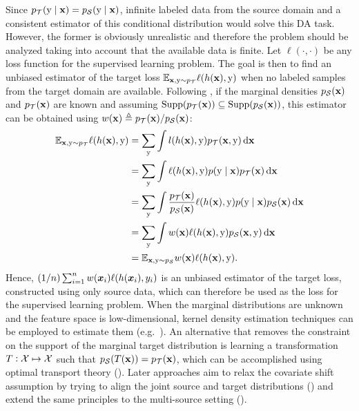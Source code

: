 Since $p_{\mathcal{T}}({\textnormal{y}} \mid {\mathbf{x}}) = p_{\mathcal{S}}({\textnormal{y}} \mid {\mathbf{x}})$, infinite labeled data from the source domain and a consistent estimator of this conditional distribution would solve this DA task. However, the former is obviously unrealistic and therefore the problem should be analyzed taking into account that the available data is finite. Let $\ell(\cdot, \cdot)$ be any loss function for the supervised learning problem. The goal is then to find an unbiased estimator of the target loss $\mathbb{E}_{{\mathbf{x}}, {\textnormal{y}} \sim p_{\mathcal{T}}} \ell(h({\mathbf{x}}),{\textnormal{y}})$ when no labeled samples from the target domain are available. Following \citet{Sugiyama2007}, if the marginal densities $p_{\mathcal{S}}({\mathbf{x}})$ and $p_{\mathcal{T}}({\mathbf{x}})$ are known and assuming $\mathrm{Supp}(p_{\mathcal{T}}({\mathbf{x}})) \subseteq \mathrm{Supp}(p_{\mathcal{S}}({\mathbf{x}}))$, this estimator can be obtained using  $w({\mathbf{x}}) \triangleq p_{\mathcal{T}}({\mathbf{x}})/p_{\mathcal{S}}({\mathbf{x}})$:
\begin{align}
	\mathbb{E}_{{\mathbf{x}}, {\textnormal{y}} \sim p_{\mathcal{T}}} \ell(h({\mathbf{x}}),{\textnormal{y}}) &= \sum_{{\textnormal{y}}} \int l(h({\mathbf{x}}),{\textnormal{y}}) p_{\mathcal{T}}({\mathbf{x}}, {\textnormal{y}}) {\,\text{d}}{\mathbf{x}} \nonumber\\
	&= \sum_{{\textnormal{y}}} \int \ell(h({\mathbf{x}}),{\textnormal{y}}) p({\textnormal{y}} \mid {\mathbf{x}}) p_{\mathcal{T}}({\mathbf{x}}) {\,\text{d}}{\mathbf{x}} \nonumber\\
	&= \sum_{{\textnormal{y}}} \int \frac{p_{\mathcal{T}}({\mathbf{x}})}{p_{\mathcal{S}}({\mathbf{x}})} \ell(h({\mathbf{x}}),{\textnormal{y}})  p({\textnormal{y}} \mid {\mathbf{x}}) p_{\mathcal{S}}({\mathbf{x}}) {\,\text{d}}{\mathbf{x}} \nonumber\\
	&= \sum_{{\textnormal{y}}} \int w({\mathbf{x}}) \ell(h({\mathbf{x}}),{\textnormal{y}})  p_{\mathcal{S}}({\mathbf{x}}, {\textnormal{y}}) {\,\text{d}}{\mathbf{x}} \nonumber\\
	&= \mathbb{E}_{{\mathbf{x}}, {\textnormal{y}} \sim p_{\mathcal{S}}} w({\mathbf{x}}) \ell(h({\mathbf{x}}),{\textnormal{y}}).
\end{align}
Hence, $(1/n) \sum_{i=1}^{n} w({\bm{x}}_i) \ell(h({\bm{x}}_i),y_i)$ is an unbiased estimator of the target loss, constructed using only source data, which can therefore be used as the loss for the supervised learning problem. When the marginal distributions are unknown and the feature space is low-dimensional, kernel density estimation techniques can be employed to estimate them (e.g.\ \citet{Shimodaira2000,Sugiyama2007,Cortes2010}). An alternative that removes the constraint on the support of the marginal target distribution is learning a transformation $T: {\mathcal{X}} \mapsto {\mathcal{X}}$ such that $p_{{\mathcal{S}}}(T({\mathbf{x}})) = p_{{\mathcal{T}}}({\mathbf{x}})$, which can be accomplished using optimal transport theory (\citet{Courty2015}). Later approaches aim to relax the covariate shift assumption by trying to align the joint source and target distributions (\citet{Courty2017}) and extend the same principles to the multi-source setting (\citet{Turrisi2020}).

